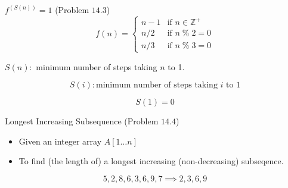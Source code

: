 
\begin{frame}{}
  \centerline{}
\end{frame}

\begin{frame}{}
  \begin{exampleblock}{$f^{(S(n))} = 1$ (Problem $14.3$)}
	\begin{displaymath}
	  f(n) = \begin{cases}
		n - 1 & \text{if } n \in \mathbb{Z}^{+} \\
		n / 2 & \text{if } n \;\%\; 2 = 0 \\
		n / 3 & \text{if } n \;\%\; 3 = 0
	  \end{cases}
	\end{displaymath}

	\centerline{$S(n):$ minimum number of steps taking $n$ to 1.}
  \end{exampleblock}

  \pause
  \[
    S(i): \text{minimum number of steps taking } i \text{ to } 1
  \]


  \pause
  \[
    S(1) = 0
  \]
\end{frame}

\begin{frame}{}
  \begin{exampleblock}{Longest Increasing Subsequence (Problem $14.4$)}
    \begin{itemize}
      \item Given an integer array $A[1 \ldots n]$
      \item To find (the length of) a longest increasing (non-decreasing) subseqence.
    \end{itemize}
  \end{exampleblock}

  \[
    5,2,8,6,3,6,9,7 \implies 2, 3, 6, 9
  \]
\end{frame}

